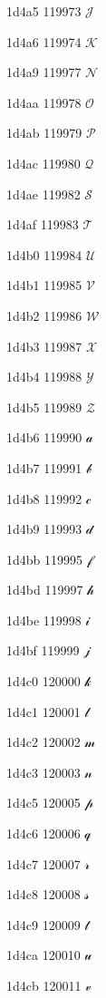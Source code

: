 \documentclass[11pt]{article}
\begin{document}
1d4a5 119973 \ensuremath{\mathscr{J}}

1d4a6 119974 \ensuremath{\mathscr{K}}

1d4a9 119977 \ensuremath{\mathscr{N}}

1d4aa 119978 \ensuremath{\mathscr{O}}

1d4ab 119979 \ensuremath{\mathscr{P}}

1d4ac 119980 \ensuremath{\mathscr{Q}}

1d4ae 119982 \ensuremath{\mathscr{S}}

1d4af 119983 \ensuremath{\mathscr{T}}

1d4b0 119984 \ensuremath{\mathscr{U}}

1d4b1 119985 \ensuremath{\mathscr{V}}

1d4b2 119986 \ensuremath{\mathscr{W}}

1d4b3 119987 \ensuremath{\mathscr{X}}

1d4b4 119988 \ensuremath{\mathscr{Y}}

1d4b5 119989 \ensuremath{\mathscr{Z}}

1d4b6 119990 \ensuremath{\mathscr{a}}

1d4b7 119991 \ensuremath{\mathscr{b}}

1d4b8 119992 \ensuremath{\mathscr{c}}

1d4b9 119993 \ensuremath{\mathscr{d}}

1d4bb 119995 \ensuremath{\mathscr{f}}

1d4bd 119997 \ensuremath{\mathscr{h}}

1d4be 119998 \ensuremath{\mathscr{i}}

1d4bf 119999 \ensuremath{\mathscr{j}}

1d4c0 120000 \ensuremath{\mathscr{k}}

1d4c1 120001 \ensuremath{\mathscr{l}}

1d4c2 120002 \ensuremath{\mathscr{m}}

1d4c3 120003 \ensuremath{\mathscr{n}}

1d4c5 120005 \ensuremath{\mathscr{p}}

1d4c6 120006 \ensuremath{\mathscr{q}}

1d4c7 120007 \ensuremath{\mathscr{r}}

1d4c8 120008 \ensuremath{\mathscr{s}}

1d4c9 120009 \ensuremath{\mathscr{t}}

1d4ca 120010 \ensuremath{\mathscr{u}}

1d4cb 120011 \ensuremath{\mathscr{v}}
\end{document}
